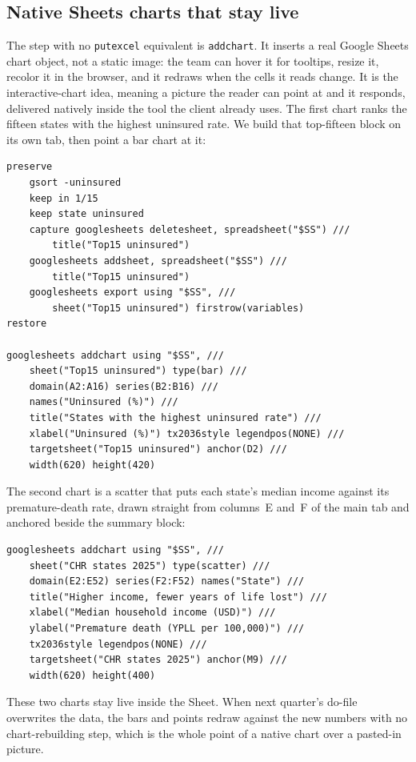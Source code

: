 \documentclass[
    a4paper,
    fontsize=10pt,
    twoside=true,
    numbers=noenddot,
]{kaobook}
\begin{document}
\subsection{Native Sheets charts that stay live}
The step with no \texttt{putexcel} equivalent is \texttt{addchart}. It inserts a real Google Sheets chart object, not a static image: the team can hover it for tooltips, resize it, recolor it in the browser, and it redraws when the cells it reads change. It is the interactive-chart idea, meaning a picture the reader can point at and it responds, delivered natively inside the tool the client already uses. The first chart ranks the fifteen states with the highest uninsured rate. We build that top-fifteen block on its own tab, then point a bar chart at it:
{\footnotesize
\begin{verbatim}
preserve
    gsort -uninsured
    keep in 1/15
    keep state uninsured
    capture googlesheets deletesheet, spreadsheet("$SS") ///
        title("Top15 uninsured")
    googlesheets addsheet, spreadsheet("$SS") ///
        title("Top15 uninsured")
    googlesheets export using "$SS", ///
        sheet("Top15 uninsured") firstrow(variables)
restore

googlesheets addchart using "$SS", ///
    sheet("Top15 uninsured") type(bar) ///
    domain(A2:A16) series(B2:B16) ///
    names("Uninsured (%)") ///
    title("States with the highest uninsured rate") ///
    xlabel("Uninsured (%)") tx2036style legendpos(NONE) ///
    targetsheet("Top15 uninsured") anchor(D2) ///
    width(620) height(420)
\end{verbatim}
}
The second chart is a scatter that puts each state's median income against its premature-death rate, drawn straight from columns~E and~F of the main tab and anchored beside the summary block:
{\footnotesize
\begin{verbatim}
googlesheets addchart using "$SS", ///
    sheet("CHR states 2025") type(scatter) ///
    domain(E2:E52) series(F2:F52) names("State") ///
    title("Higher income, fewer years of life lost") ///
    xlabel("Median household income (USD)") ///
    ylabel("Premature death (YPLL per 100,000)") ///
    tx2036style legendpos(NONE) ///
    targetsheet("CHR states 2025") anchor(M9) ///
    width(620) height(400)
\end{verbatim}
}
These two charts stay live inside the Sheet. When next quarter's do-file overwrites the data, the bars and points redraw against the new numbers with no chart-rebuilding step, which is the whole point of a native chart over a pasted-in picture.
\end{document}
